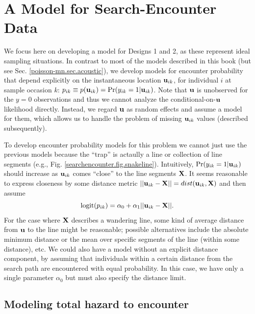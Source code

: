 \section{A Model for Search-Encounter Data}

We focus here on developing a model for Designs 1 and 2, as these
represent ideal sampling situations.  In contrast to most of the models
described in this book (but see Sec. \ref{poisson-mn.sec.acoustic}), we
develop models for encounter probability that depend explicitly on the
instantaneous location ${\bf u}_{ik}$, for individual $i$ at sample
occasion $k$: $p_{ik} \equiv p({\bf u}_{ik}) = \Pr(y_{ik}=1|{\bf
  u}_{ik})$.  Note that ${\bf u}$ is unobserved for the $y=0$
observations and thus we cannot analyze the conditional-on-${\bf u}$
likelihood directly. Instead, we regard ${\bf u}$ as random effects
and assume a model for them, which allows us to handle the
problem of missing ${\bf u}_{ik}$ values (described subsequently).

To develop encounter probability models for this problem we cannot
just use the previous models because the ``trap'' is actaully a line
or collection of line segments (e.g.,
Fig. \ref{searchencounter.fig.snakeline}).  Intuitively,
$\Pr(y_{ik}=1|{\bf u}_{ik})$ should increase as ${\bf u}_{ik}$ comes
``close'' to the line segments ${\bf X}$. It seems reasonable to
express closeness by some distance metric $||{\bf u}_{ik} - {\bf X}
|| = dist( {\bf u}_{ik}, {\bf X})$ and then assume
\[
\mbox{logit}(p_{ik}) = \alpha_{0} + \alpha_{1} ||{\bf u}_{ik} - {\bf X}||.
\]
For the case where ${\bf X}$ describes a wandering line, some
kind of average distance from ${\bf u}$ to the line
might be reasonable; possible alternatives include the absolute
minimum distance or the mean over specific segments
of the line (within some distance), etc.  We could also have a model
without an explicit distance component, by assuming that individuals
within a certain distance from the search path are encountered with
equal probability. In this case, we have only a single parameter
$\alpha_{0}$ but must also specify the distance limit. 

\subsection{Modeling total hazard to encounter}

